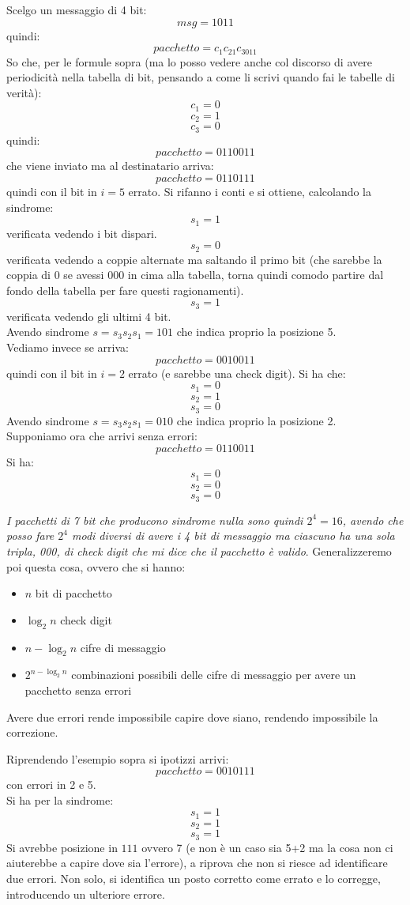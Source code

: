 \documentclass[a4paper,12pt, oneside]{book}
\begin{document}
\begin{esempio}
  Scelgo un messaggio di 4 bit:
  \[msg=1011\]
  quindi:
  \[pacchetto=c_1c_21c_3011\]
  So che, per le formule sopra (ma lo posso vedere anche col discorso di avere
  periodicità nella tabella di bit, pensando a come li scrivi quando fai le
  tabelle di verità):
  \[c_1=0\]
  \[c_2=1\]
  \[c_3=0\]
  quindi:
  \[pacchetto=0110011\]
  che viene inviato ma al destinatario arriva:
  \[pacchetto=0110111\]
  quindi con il bit in $i=5$ errato. Si rifanno i conti e si ottiene, calcolando
  la sindrome:
  \[s_1=1\]
  verificata vedendo i bit dispari.
  \[s_2=0\]
  verificata vedendo a coppie alternate ma saltando il primo bit (che sarebbe la
  coppia di 0 se avessi 000 in cima alla tabella, torna quindi comodo partire
  dal fondo della tabella per fare questi ragionamenti).
  \[s_3=1\]
  verificata vedendo gli ultimi 4 bit.\\
  Avendo sindrome $s=s_3s_2s_1=101$ che indica proprio la posizione 5.\\
  Vediamo invece se arriva:
  \[pacchetto=0010011\]
  quindi con il bit in $i=2$ errato (e sarebbe una check digit). Si ha che:
  \[s_1=0\]
  \[s_2=1\]
  \[s_3=0\]
  Avendo sindrome $s=s_3s_2s_1=010$ che indica proprio la posizione 2.\\
  Supponiamo ora che arrivi senza errori:
  \[pacchetto=0110011\]
  Si ha:
  \[s_1=0\]
  \[s_2=0\]
  \[s_3=0\]
\end{esempio}
\textit{I pacchetti di 7 bit che producono sindrome nulla sono quindi
  $2^{4}=16$, avendo che posso fare $2^4$ modi diversi di avere i 4 bit di
  messaggio ma ciascuno ha una sola tripla, 000, di check digit che mi dice che
  il pacchetto è valido}. Generalizzeremo poi questa cosa, ovvero che si hanno:
\begin{itemize}
  \item $n$ bit di pacchetto 
  \item $\log_2 n$ check digit
  \item $n-\log_2 n$ cifre di messaggio
  \item $2^{n-\log_2 n}$ combinazioni possibili delle cifre di messaggio per avere
  un pacchetto senza errori
\end{itemize}
Avere due errori rende impossibile capire dove siano, rendendo impossibile la
correzione.
\begin{esempio}
  Riprendendo l'esempio sopra si ipotizzi arrivi:
  \[pacchetto=0010111\]
  con errori in 2 e 5.\\
  Si ha per la sindrome:
  \[s_1=1\]
  \[s_2=1\]
  \[s_3=1\]
  Si avrebbe posizione in $111$ ovvero 7 (e non è un caso sia 5+2 ma la cosa non
  ci aiuterebbe a capire dove sia l'errore), a riprova
  che non si riesce ad identificare due errori. Non solo, si identifica un posto
  corretto come errato e lo corregge, introducendo un ulteriore errore.
\end{esempio}
\end{document}
